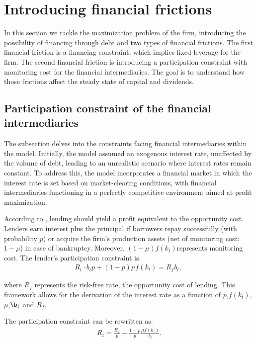 \documentclass[12pt]{report}
\begin{document}
\section{Introducing financial frictions}
In this section we tackle the maximization problem of the firm, introducing the possibility of financing through
debt and two types of financial frictions. The first financial friction is a financing constraint, which implies fixed
leverage for the firm. The second financial friction is introducing a participation
constraint with monitoring cost for the financial intermediaries. The goal is to understand how those frictions
affect the steady state of capital and dividends.

\subsection{Participation constraint of the financial intermediaries } 
The subsection delves into the constraints facing financial intermediaries within the model. Initially, the model assumed an exogenous
interest rate, unaffected by the volume of debt, leading to an unrealistic scenario where interest rates remain
constant.  To address this,  the model incorporates a financial market in which the interest rate is set based on
market-clearing conditions, with financial intermediaries functioning in a perfectly competitive environment aimed at
profit maximization. 

According to \cite{BerGer86}, lending should yield a profit equivalent to the opportunity cost. Lenders earn
interest plus the principal if borrowers repay successfully (with probability \(p\)) or acquire the firm's production
assets (net of monitoring cost: \(1-\mu\)) in case of bankruptcy. Moreover, \((1-\mu)f(k_t)\)represents monitoring cost.
The lender's participation constraint is:
\begin{align*}
    R_t \cdot b_t p + (1-p) \mu f(k_t) = R_f b_t, \
\end{align*}

where \(R_f\) represents the risk-free rate, the opportunity cost of lending. This
framework allows for  the derivation of the interest rate as a function of \(p\),\(f(k_t)\),\(\mu\),\(\b_t\) and \(R_f\).

The participation constraint can be rewritten as:
\begin{align}
    R_t=\frac{R_f}{p}  -\frac{ 1-p }{ p }\frac{\mu f(k_t)}{b_t}. \label{eq21}
\end{align}
\end{document}
